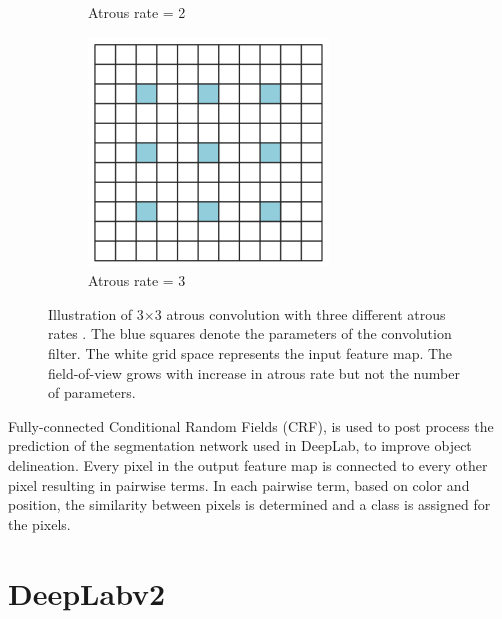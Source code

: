 \begin{figure}
\begin{subfigure}{.27\textwidth}
			\caption{Atrous rate = 2}
		\end{subfigure}
		\begin{subfigure}{.27\textwidth}
			\centering
			\includegraphics[width=1\linewidth]{images/r_3}
			\caption{Atrous rate = 3}
		\end{subfigure}
		\caption{Illustration of 3$\times$3 atrous convolution with three different atrous rates \cite{DBLP:journals/corr/Garcia-GarciaOO17}. The blue squares denote the parameters of the convolution filter. The white grid space represents the input feature map. The field-of-view grows with increase in atrous rate but not the number of parameters.}
		\label{Fig:atconv}
	\end{figure}
	
Fully-connected Conditional Random Fields (CRF), is used to post process the prediction of the segmentation network used in DeepLab, to improve object delineation. Every pixel in the output feature map is connected to every other pixel resulting in pairwise terms. In each pairwise term, based on color and position, the similarity between pixels is determined and a class is assigned for the pixels.


\section{DeepLabv2}

